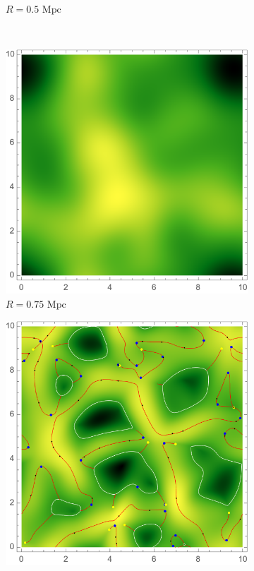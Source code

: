 \documentclass[a4paper, 11pt]{article}
\begin{document}
\begin{figure}
\begin{subfigure}[b]{0.3\textwidth}
\caption{$R=0.5\text{ Mpc}$}
\label{fig:}
\end{subfigure}\\
\begin{subfigure}[b]{0.3\textwidth}
\includegraphics[width=\textwidth]{ScaleR=075_Psi}
\caption{$R=0.75\text{ Mpc}$}
\label{fig:}
\end{subfigure}
\begin{subfigure}[b]{0.3\textwidth}
\includegraphics[width=\textwidth]{ScaleR=075_skelet}

\end{subfigure}
\end{figure}
\end{document}
